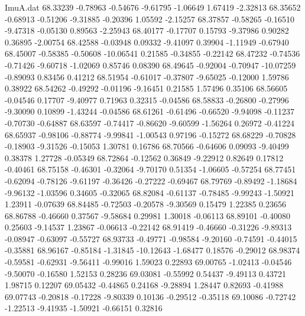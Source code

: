 \begin{filecontents}{ImuA.dat}
  68.33239   -0.78963   -0.54676   -9.61795   -1.06649    1.67419   -2.32813
  68.35652   -0.68913   -0.51206   -9.31885   -0.20396    1.05592   -2.15257
  68.37857   -0.58265   -0.16510   -9.47318   -0.05130    0.89563   -2.25943
  68.40177   -0.17707    0.15793   -9.37986    0.90282    0.36895   -2.00754
  68.42588   -0.03948    0.09332   -9.41097    0.39904   -1.11949   -0.67940
  68.45007   -0.58385   -0.50608  -10.06541    0.21585   -0.34855   -0.22142
  68.47232   -0.74536   -0.71426   -9.60718   -1.02069    0.85746    0.08390
  68.49645   -0.92004   -0.70947  -10.07259   -0.89093    0.83456    0.41212
  68.51954   -0.61017   -0.37807   -9.65025   -0.12000    1.59786    0.38922
  68.54262   -0.49292   -0.01196   -9.16451    0.21585    1.57496    0.35106
  68.56605   -0.04546    0.17707   -9.40977    0.71963    0.32315   -0.04586
  68.58833   -0.26800   -0.27996   -9.30090    0.10899   -1.43244   -0.04586
  68.61261   -0.61496   -0.66520   -9.94098   -0.11237   -0.70730   -0.64887
  68.63597   -0.74417   -0.86620   -9.60599   -1.56264    0.26972   -0.41224
  68.65937   -0.98106   -0.88774   -9.99841   -1.00543    0.97196   -0.15272
  68.68229   -0.70828   -0.18903   -9.31526   -0.15053    1.30781    0.16786
  68.70566   -0.64606    0.09093   -9.40499    0.38378    1.27728   -0.05349
  68.72864   -0.12562    0.36849   -9.22912    0.82649    0.17812   -0.40461
  68.75158   -0.46301   -0.32064   -9.70170    0.51354   -1.06605   -0.57254
  68.77451   -0.62094   -0.78126   -9.61197   -0.36426   -0.27222   -0.69467
  68.79769   -0.89492   -1.18684   -9.96132   -1.03596    0.34605   -0.32065
  68.82084   -0.61137   -0.78485   -9.99243   -1.50921    1.23911   -0.07639
  68.84485   -0.72503   -0.20578   -9.30569    0.15479    1.22385    0.23656
  68.86788   -0.46660    0.37567   -9.58684    0.29981    1.30018   -0.06113
  68.89101   -0.40080    0.25603   -9.14537    1.23867   -0.06613   -0.22142
  68.91419   -0.46660   -0.31226   -9.89313   -0.08947   -0.63097   -0.55727
  68.93733   -0.49771   -0.98584   -9.20160   -0.74591   -0.44015   -0.35881
  68.96167   -0.85184   -1.31845  -10.12643   -1.68477    0.18576   -0.29012
  68.98374   -0.59581   -0.62931   -9.56411   -0.99016    1.59023    0.22893
  69.00765   -1.02413   -0.04546   -9.50070   -0.16580    1.52153    0.28236
  69.03081   -0.55992    0.54437   -9.49113    0.43721    1.98715    0.12207
  69.05432   -0.44865    0.24168   -9.28894    1.28447    0.82693   -0.41988
  69.07743   -0.20818   -0.17228   -9.80339    0.10136   -0.29512   -0.35118
  69.10086   -0.72742   -1.22513   -9.41935   -1.50921   -0.66151    0.32816

\end{filecontents}
